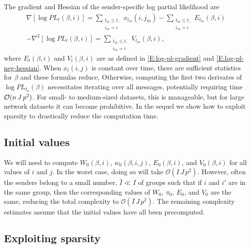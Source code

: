 \documentclass[final]{statsoc}
\begin{document}
The gradient and Hessian of the sender-specific log partial likelihood
are
\begin{gather*}
    \nabla [ \log \mathit{PL}_t(\beta, i) ]
        =
        \sum_{\substack{t_m \leq t, \\ i_m = i}}
            x_{t_m}\!(i,j_m)
            -\!\!
            \sum_{\substack{t_m \leq t, \\ i_m = i}}
                E_{t_m}(\beta, i) \\
    -\nabla^2 [ \log \mathit{PL}_t(\beta, i) ]
        =
        \sum_{\substack{t_m \leq t, \\ i_m = i}}
          V_{t_m}(\beta, i),
\end{gather*}
where $E_{t}(\beta,i)$ and $V_{t}(\beta, i)$ are as defined in
\eqref{E:log-pl-gradient} and \eqref{E:log-pl-neg-hessian}.
When $x_t(i,j)$ is constant over time,
there are sufficient statistics for $\beta$ and these formulas reduce.
Otherwise, computing the first two derivates of
$\log \mathit{PL}_{t_n}(\beta)$
necessitates iterating over all messages, potentially requiring time
$\mathcal{O}(n \, J \, p^2)$.  For small- to medium-sized datasets, this is manageable,
but for large network datasets it can become
prohibitive.  In the sequel we show how to exploit sparsity to drastically
reduce the computation time.

\subsection{Initial values}

We will need to compute $W_0(\beta, i)$, $w_0(\beta, i, j)$, $E_0(\beta,
i)$, and $V_0(\beta, i)$ for all values of $i$ and $j$.  In the worst case,
doing so will take $\mathcal{O}(I \, J \, p^2)$.  However, often the senders
belong to a small number, $\bar I \ll I$ of groups such that if $i$ and $i'$
are in the same group, then the corresponding values of $W_0$, $\pi_0$, $E_0$,
and $V_0$ are the same, reducing the total complexity to $\mathcal{O}(\bar I
\, J \, p^2)$.  The remaining complexity estimates assume that the
initial values have all been precomputed.


\subsection{Exploiting sparsity}
\end{document}
